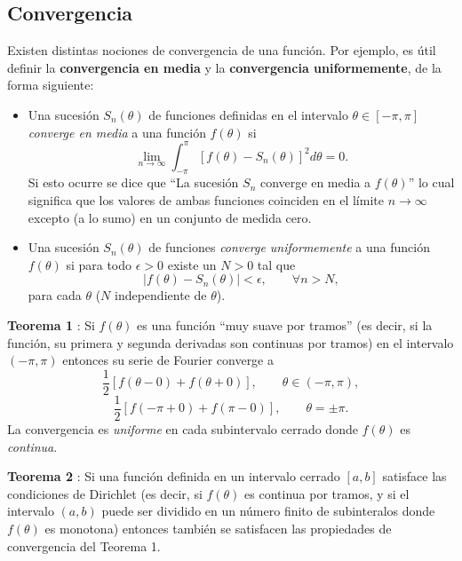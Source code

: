 \subsection{Convergencia}
Existen distintas nociones de convergencia de una función. Por ejemplo, es útil definir la \textbf{convergencia en media} y la \textbf{convergencia uniformemente}, de la forma siguiente:
\begin{itemize}
\item Una sucesión $S_n(\theta)$ de funciones definidas en el intervalo $\theta\in[-\pi,\pi]$ \textit{converge en media} a una función $f(\theta)$ si
\begin{equation}
\lim_{n\to\infty}\int_{-\pi}^{\pi}\left[f(\theta)-S_n(\theta)\right]^2d\theta=0.
\end{equation}
Si esto ocurre se dice que ``La sucesión $S_n$ converge en media a $f(\theta)$'' lo cual significa que los valores de ambas funciones coinciden en el límite $n\to\infty$ excepto (a lo sumo) en un conjunto de medida cero.

\item Una sucesión $S_n(\theta)$ de funciones \textit{converge uniformemente} a una función $f(\theta)$ si para todo $\epsilon>0$ existe un $N>0$ tal que
\begin{equation}
\left|f(\theta)-S_n(\theta)\right|<\epsilon, \qquad \forall n>N,
\end{equation}
para cada $\theta$ ($N$ independiente de $\theta$).
\end{itemize}

\textbf{Teorema 1} \cite{Butkov}: Si $f(\theta)$ es una función ``muy suave por tramos'' (es decir, si la función, su primera y segunda derivadas son continuas por tramos) en el intervalo $(-\pi,\pi)$ entonces su serie de Fourier converge a
\begin{equation}
\frac{1}{2}\left[f(\theta-0)+f(\theta+0)\right], \qquad \theta\in (-\pi,\pi),
\end{equation}
\begin{equation}
\frac{1}{2}\left[f(-\pi+0)+f(\pi-0)\right], \qquad \theta=\pm\pi .
\end{equation}
La convergencia es \textit{uniforme} en cada subintervalo cerrado donde $f(\theta)$ es \textit{continua}.

\textbf{Teorema 2} \cite{Butkov}: Si una función definida en un intervalo cerrado $[a,b]$ satisface las condiciones de Dirichlet (es decir, si $f(\theta)$ es continua por tramos, y si el intervalo $(a,b)$ puede ser dividido en un número finito de subinteralos donde $f(\theta)$ es monotona) entonces también se satisfacen las propiedades de convergencia del Teorema 1.

